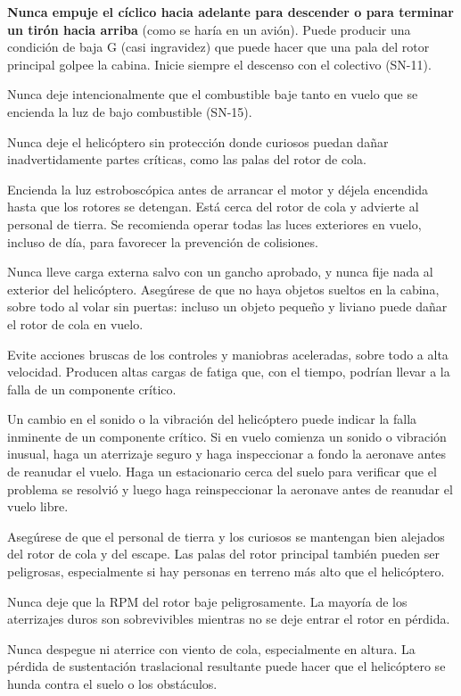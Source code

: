 \begin{pasos}
\item \textbf{Nunca empuje el cíclico hacia adelante para descender o para terminar un tirón hacia arriba} (como se haría en un avión). Puede producir una condición de baja G (casi ingravidez) que puede hacer que una pala del rotor principal golpee la cabina. Inicie siempre el descenso con el colectivo (SN-11).
\item Nunca deje intencionalmente que el combustible baje tanto en vuelo que se encienda la luz de bajo combustible (SN-15).
\item Nunca deje el helicóptero sin protección donde curiosos puedan dañar inadvertidamente partes críticas, como las palas del rotor de cola.
\item Encienda la luz estroboscópica antes de arrancar el motor y déjela encendida hasta que los rotores se detengan. Está cerca del rotor de cola y advierte al personal de tierra. Se recomienda operar todas las luces exteriores en vuelo, incluso de día, para favorecer la prevención de colisiones.
\item Nunca lleve carga externa salvo con un gancho aprobado, y nunca fije nada al exterior del helicóptero. Asegúrese de que no haya objetos sueltos en la cabina, sobre todo al volar sin puertas: incluso un objeto pequeño y liviano puede dañar el rotor de cola en vuelo.
\item Evite acciones bruscas de los controles y maniobras aceleradas, sobre todo a alta velocidad. Producen altas cargas de fatiga que, con el tiempo, podrían llevar a la falla de un componente crítico.
\item Un cambio en el sonido o la vibración del helicóptero puede indicar la falla inminente de un componente crítico. Si en vuelo comienza un sonido o vibración inusual, haga un aterrizaje seguro y haga inspeccionar a fondo la aeronave antes de reanudar el vuelo. Haga un estacionario cerca del suelo para verificar que el problema se resolvió y luego haga reinspeccionar la aeronave antes de reanudar el vuelo libre.
\item Asegúrese de que el personal de tierra y los curiosos se mantengan bien alejados del rotor de cola y del escape. Las palas del rotor principal también pueden ser peligrosas, especialmente si hay personas en terreno más alto que el helicóptero.
\item Nunca deje que la RPM del rotor baje peligrosamente. La mayoría de los aterrizajes duros son sobrevivibles mientras no se deje entrar el rotor en pérdida.
\item Nunca despegue ni aterrice con viento de cola, especialmente en altura. La pérdida de sustentación traslacional resultante puede hacer que el helicóptero se hunda contra el suelo o los obstáculos.

\end{pasos}

